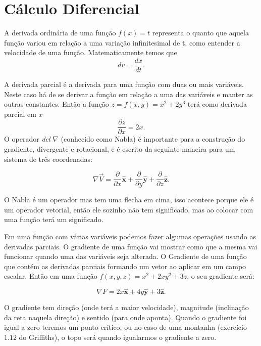 \newpage
\section{Cálculo Diferencial}
A derivada ordinária de uma função $f(x) = t$ representa o quanto que aquela função variou em relação a  uma variação infinitesimal de t, como entender a velocidade de uma função. Matematicamente temos que
\begin{equation}
    dv = \frac{dx}{dt} .
\end{equation}



A derivada parcial é a derivada para uma função com duas ou mais variáveis. Neste caso há de se derivar a função em relação a uma das variáveis e manter as outras constantes. Então a função $z = f(x,y)=x^2 + 2y^3$ terá como derivada parcial em $x$ 
\begin{equation}
    \frac{\partial z}{\partial x} = 2x .
\end{equation}
O operador \textit{del} $\nabla$ (conhecido como Nabla) é importante para a construção do gradiente, divergente e rotacional, e é escrito da seguinte maneira para um sistema de três coordenadas: 

\begin{equation}
    \nabla \Vec{V} = \frac{\partial}{\partial x} \hat{\textbf{x}} + \frac{\partial}{\partial y} \hat{\textbf{y}}+\frac{\partial}{\partial z} \hat{\textbf{z}}.
\end{equation}

O Nabla é um operador mas tem uma flecha em cima, isso acontece porque ele é um operador vetorial, então ele sozinho não tem significado, mas ao colocar com uma função terá um significado.

Em uma função com várias variáveis podemos fazer algumas operações usando as derivadas parciais. O gradiente de uma função vai mostrar como que a mesma vai funcionar quando uma das variáveis seja alterada. 
O Gradiente de uma função que contém as derivadas parciais formando um vetor ao aplicar em um campo escalar. Então em uma função $f(x,y,z) = x^2 + 2xy^2 + 3z$, o seu gradiente será:

\begin{equation}
    \nabla F = 2x \hat{\textbf{x}} + 4y \hat{\textbf{y}} + 3 \hat{\textbf{z}} .
\end{equation}

O gradiente tem direção (onde terá a maior velocidade), magnitude (inclinação da reta naquela direção) e sentido (para onde aponta). Quando o gradiente foi igual a zero teremos um ponto crítico, ou no caso de uma montanha (exercício $1.12$ do Griffiths), o topo será quando igualarmos o gradiente a zero. 


